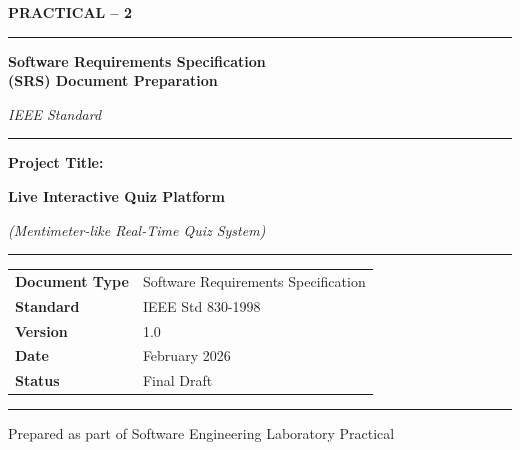 \documentclass[12pt,a4paper]{article}
\begin{document}
\begin{titlepage}
  \centering
  \vspace*{1.5cm}

  {\LARGE\bfseries\color{primary} PRACTICAL -- 2 \par}
  \vspace{0.4cm}
  \rule{0.8\linewidth}{1.5pt}
  \vspace{0.4cm}

  {\Large\bfseries Software Requirements Specification\\[4pt]
   (SRS) Document Preparation\par}
  \vspace{0.3cm}
  {\large\itshape IEEE Standard\par}

  \vspace{1cm}
  \rule{0.6\linewidth}{0.5pt}
  \vspace{1cm}

  {\large\bfseries Project Title:\par}
  \vspace{0.3cm}
  {\LARGE\bfseries\color{primary} Live Interactive Quiz Platform\par}
  \vspace{0.2cm}
  {\large\itshape (Mentimeter-like Real-Time Quiz System)\par}

  \vspace{1.5cm}
  \rule{0.6\linewidth}{0.5pt}
  \vspace{1cm}

  \begin{tabular}{ll}
    \textbf{Document Type}   & Software Requirements Specification \\[4pt]
    \textbf{Standard}        & IEEE Std 830-1998                   \\[4pt]
    \textbf{Version}         & 1.0                                 \\[4pt]
    \textbf{Date}            & February 2026                       \\[4pt]
    \textbf{Status}          & Final Draft                         \\
  \end{tabular}

  \vfill
  \rule{0.8\linewidth}{1pt}
  {\small Prepared as part of Software Engineering Laboratory Practical}
\end{titlepage}
\end{document}
